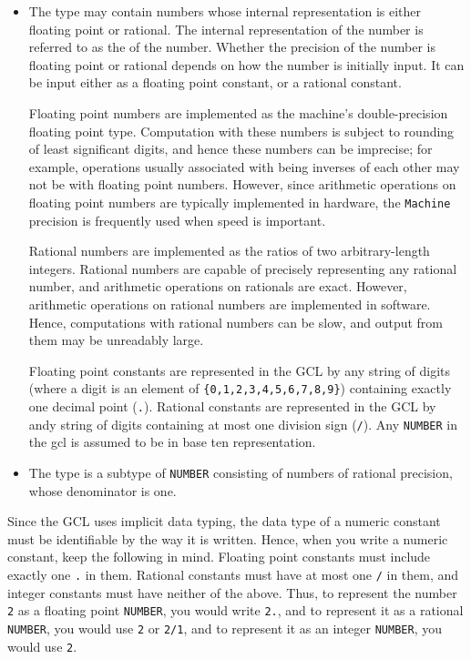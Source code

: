 \begin{itemize}
\item {}

The  type may contain numbers whose internal
representation is either floating point or rational.  The internal
representation of the number is referred to as the 
of the number.  Whether the precision of the number is floating point
or rational depends on how the number is initially input.  It can be
input either as a floating point constant, or a rational constant.

Floating point numbers are implemented as the machine's
double-precision floating point type.  Computation with these numbers
is subject to rounding of least significant digits, and hence these
numbers can be imprecise; for example, operations usually associated
with being inverses of each other may not be with floating point
numbers. However, since arithmetic operations on floating point
numbers are typically implemented in hardware, the {\tt Machine}
precision is frequently used when speed is important.

Rational numbers are implemented as the ratios of two arbitrary-length
integers. Rational numbers are capable of precisely representing any
rational number, and arithmetic operations on rationals are exact.
However, arithmetic operations on rational numbers are implemented in
software.  Hence, computations with rational numbers can be slow, and
output from them may be unreadably large.

Floating point constants are represented in the GCL by any string of
digits (where a digit is an element of \verb+{0,1,2,3,4,5,6,7,8,9}+)
containing exactly one decimal point (\verb+.+).  Rational constants
are represented in the GCL by andy string of digits containing at most
one division sign (\verb+/+).  Any \verb+NUMBER+ in the gcl is assumed
to be in base ten representation.

\item {}

The  type is a subtype of \verb+NUMBER+ consisting of
numbers of rational precision, whose denominator is one.  

\end{itemize}

Since the GCL uses implicit data typing, the data type of a numeric
constant must be identifiable by the way it is written.  Hence, when
you write a numeric constant, keep the following in mind.  Floating
point constants must include exactly one \verb+.+ in them.  Rational
constants must have at most one \verb+/+ in them, and integer
constants must have neither of the above. Thus, to represent the
number \verb+2+ as a floating point \verb+NUMBER+, you would write
\verb+2.+, and to represent it as a rational \verb+NUMBER+, you would
use \verb+2+ or \verb+2/1+, and to represent it as an integer
\verb+NUMBER+, you would use \verb+2+.

